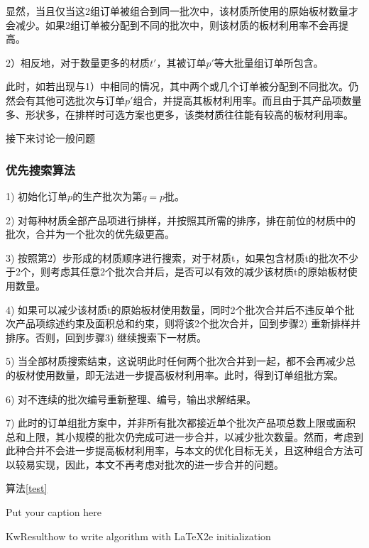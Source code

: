 \documentclass[bwprint]{gmcmthesis}
\begin{document}
显然，当且仅当这2组订单被组合到同一批次中，该材质所使用的原始板材数量才会减少。如果2组订单被分配到不同的批次中，则该材质的板材利用率不会再提高。

2）相反地，对于数量更多的材质$t'$，其被订单$p'$等大批量组订单所包含。

此时，如若出现与1）中相同的情况，其中两个或几个订单被分配到不同批次。仍然会有其他可选批次与订单$p'$组合，并提高其板材利用率。而且由于其产品项数量多、形状多，在排样时可选方案也更多，该类材质往往能有较高的板材利用率。

接下来讨论一般问题



\subsubsection{优先搜索算法}
1) 初始化订单$p$的生产批次为第$q=p$批。

2) 对每种材质全部产品项进行排样，并按照其所需的排序，排在前位的材质中的批次，合并为一个批次的优先级更高。

3) 按照第2）步形成的材质顺序进行搜索，对于材质t，如果包含材质t的批次不少于2个，则考虑其任意2个批次合并后，是否可以有效的减少该材质t的原始板材使用数量。

4) 如果可以减少该材质t的原始板材使用数量，同时2个批次合并后不违反单个批次产品项综述约束及面积总和约束，则将该2个批次合并，回到步骤2) 重新排样并排序。否则，回到步骤3) 继续搜索下一材质。

5) 当全部材质搜索结束，这说明此时任何两个批次合并到一起，都不会再减少总的板材使用数量，即无法进一步提高板材利用率。此时，得到订单组批方案。

6) 对不连续的批次编号重新整理、编号，输出求解结果。

7) 此时的订单组批方案中，并非所有批次都接近单个批次产品项总数上限或面积总和上限，其小规模的批次仍完成可进一步合并，以减少批次数量。然而，考虑到此种合并不会进一步提高板材利用率，与本文的优化目标无关，且这种组合方法可以较易实现，因此，本文不再考虑对批次的进一步合并的问题。

算法\ref{test}
\begin{algorithm}
    \caption{Put your caption here}\label{test}
    \begin{multicols}{2}
        \SetAlgoLined
        KwResult{how to write algorithm with \LaTeX2e }
        initialization\;
    \end{multicols}
\end{algorithm}
\end{document}
